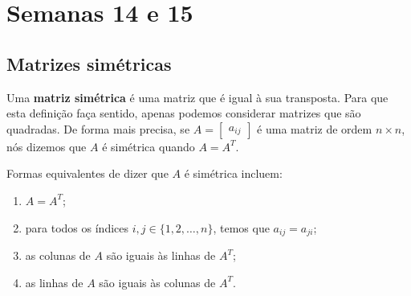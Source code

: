 

\providecommand{\dir}{..}  %

%

\chapter{Semanas 14 e 15}

\section{Matrizes simétricas}

Uma \textbf{matriz simétrica} é uma matriz que é igual à sua transposta. Para que esta definição faça sentido, apenas podemos considerar matrizes que são quadradas. De forma mais precisa, se $A = \begin{bmatrix} a_{ij} \end{bmatrix}$ é uma matriz de ordem $n \times n$, nós dizemos que $A$ é simétrica quando $A = A^T$.

Formas equivalentes de dizer que $A$ é simétrica incluem:
\begin{enumerate}[$(1)$]
	\item $A = A^T$;
	\item para todos os índices $i,j \in \{1,2,\dots,n\}$, temos que $a_{ij} = a_{ji}$;
	\item as colunas de $A$ são iguais às linhas de $A^T$;
	\item as linhas de $A$ são iguais às colunas de $A^T$.
\end{enumerate}

